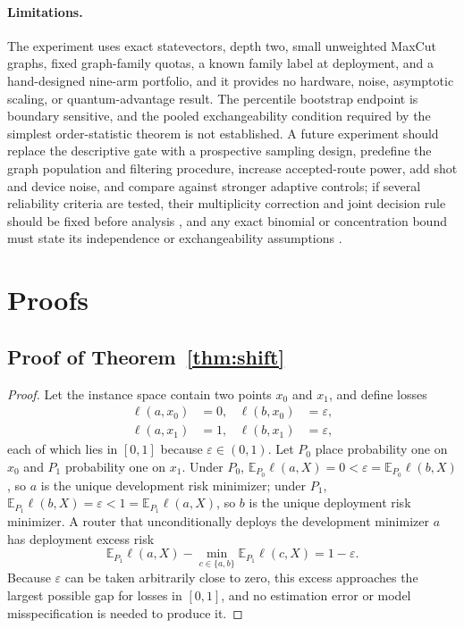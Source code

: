 \documentclass[10pt,twocolumn]{article}
\newcommand{\E}{\mathbb{E}}
\begin{document}
\paragraph{Limitations.}
The experiment uses exact statevectors, depth two, small unweighted MaxCut
graphs, fixed graph-family quotas, a known family label at deployment, and a
hand-designed nine-arm portfolio, and it provides no hardware, noise, asymptotic
scaling, or quantum-advantage result.  The percentile bootstrap endpoint is
boundary sensitive, and the pooled exchangeability condition required by the
simplest order-statistic theorem is not established.  A future experiment should
replace the descriptive gate with a prospective sampling design, predefine the
graph population and filtering procedure, increase accepted-route power, add shot
and device noise, and compare against stronger adaptive controls; if several
reliability criteria are tested, their multiplicity correction and joint decision
rule should be fixed before analysis \citep{benjamini1995controlling}, and any
exact binomial or concentration bound must state its independence or
exchangeability assumptions \citep{clopper1934fiducial,hoeffding1963probability}.

\clearpage



\clearpage
\onecolumn
\appendix

\section{Proofs}

\subsection{Proof of Theorem~\ref{thm:shift}}
\label{app:proof-shift}

\begin{proof}
Let the instance space contain two points $x_0$ and $x_1$, and define losses
\[
\begin{aligned}
 \ell(a,x_0)&=0, & \ell(b,x_0)&=\varepsilon,\\
 \ell(a,x_1)&=1, & \ell(b,x_1)&=\varepsilon,
\end{aligned}
\]
each of which lies in $[0,1]$ because $\varepsilon\in(0,1)$.  Let $P_0$ place
probability one on $x_0$ and $P_1$ probability one on $x_1$.  Under $P_0$,
$\E_{P_0}\ell(a,X)=0<\varepsilon=\E_{P_0}\ell(b,X)$, so $a$ is the unique
development risk minimizer; under $P_1$,
$\E_{P_1}\ell(b,X)=\varepsilon<1=\E_{P_1}\ell(a,X)$, so $b$ is the unique
deployment risk minimizer.  A router that unconditionally deploys the development
minimizer $a$ has deployment excess risk
\[
 \E_{P_1}\ell(a,X)-\min_{c\in\{a,b\}}\E_{P_1}\ell(c,X)
 =1-\varepsilon .
\]
Because $\varepsilon$ can be taken arbitrarily close to zero, this excess
approaches the largest possible gap for losses in $[0,1]$, and no estimation
error or model misspecification is needed to produce it.
\end{proof}
\end{document}
